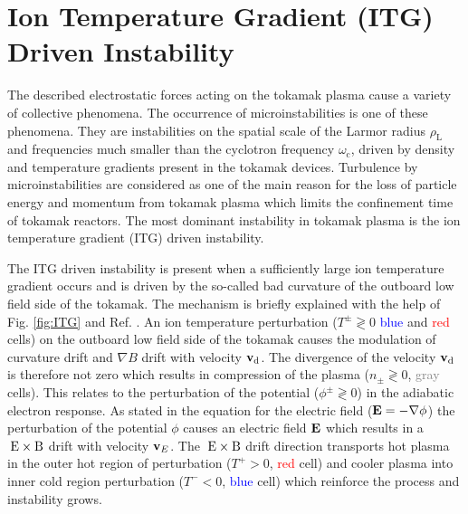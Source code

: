 \newpage
\section{Ion Temperature Gradient (ITG) Driven Instability}
\label{sec:ITG}

The described electrostatic forces acting on the tokamak plasma cause a variety of collective phenomena. The occurrence of microinstabilities is one of these phenomena. They are instabilities on the spatial scale of the Larmor radius $\rho_\mathrm{L}$ and frequencies much smaller than the cyclotron frequency $\omega_\mathrm{c}$, driven by density and temperature gradients present in the tokamak devices. Turbulence by microinstabilities are considered as one of the main reason for the loss of particle energy and momentum from tokamak plasma \cite{Brizard2007, Garbet2010, Horton1999} which limits the confinement time of tokamak reactors. The most dominant instability in tokamak plasma is the ion temperature gradient (ITG) driven instability. \cite{Coppi1967, Cowley1991, Rudakov1961}


The ITG driven instability is present when a sufficiently large ion temperature gradient occurs and is driven by the so-called bad curvature of the outboard low field side of the tokamak. The mechanism is briefly explained with the help of Fig. \ref{fig:ITG} and Ref. . An ion temperature perturbation ($T^\pm \gtrless 0$ \textcolor{blue}{blue} and \textcolor{red}{red} cells) on the outboard low field side of the tokamak causes the modulation of curvature drift and $\nabla B$ drift with velocity $\boldsymbol{\mathbf{v}}_\mathrm{d}$. The divergence of the velocity $\boldsymbol{\mathbf{v}}_\mathrm{d}$ is therefore not zero which results in compression of the plasma ($n_\pm \gtrless 0$, \textcolor{gray}{gray} cells). This relates to the perturbation of the potential ($\phi^\pm  \gtrless 0$) in the adiabatic electron response. As stated in the equation for the electric field ($\boldsymbol{\mathbf{E}} = -\nabla \phi$) the perturbation of the potential $\phi$ causes an electric field $\boldsymbol{\mathbf{E}}$ which results in a $\mathrm{\:E}\times\mathrm{B}$ drift with velocity $\boldsymbol{\mathbf{v}}_E$. The $\mathrm{\:E}\times\mathrm{B}$ drift direction transports hot plasma in the outer hot region of perturbation ($T^+ > 0$, \textcolor{red}{red} cell) and cooler plasma into inner cold region perturbation ($T^- < 0$, \textcolor{blue}{blue} cell) which reinforce the process and instability grows.\bigskip

